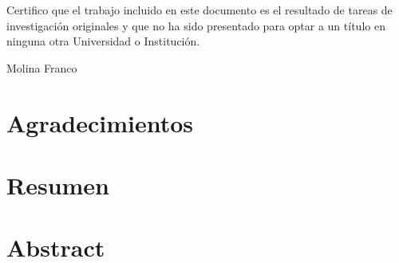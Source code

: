 \documentclass[spanish,a4paper,oneside,10pt,openright]{book}
\newcommand{\authorname}{{Molina Franco}}
\begin{document}
 \cleardoublepage

Certifico que el trabajo incluido en este documento es el resultado de tareas de investigación
originales y que no ha sido presentado para optar a un título en ninguna otra
Universidad o Institución.

\vspace{3cm}
\begin{flushright}
\authorname
\end{flushright}

\clearpage 

\thispagestyle{empty} %
\mbox{}               %
\clearpage            %

\chapter*{Agradecimientos} 



\phantom{p. 1}
\clearpage
\thispagestyle{empty}
\phantom{p. 2}
\clearpage

\chapter*{Resumen} %


\phantom{p. 1}
\clearpage
\thispagestyle{empty}

\chapter*{Abstract} %

\end{document}
